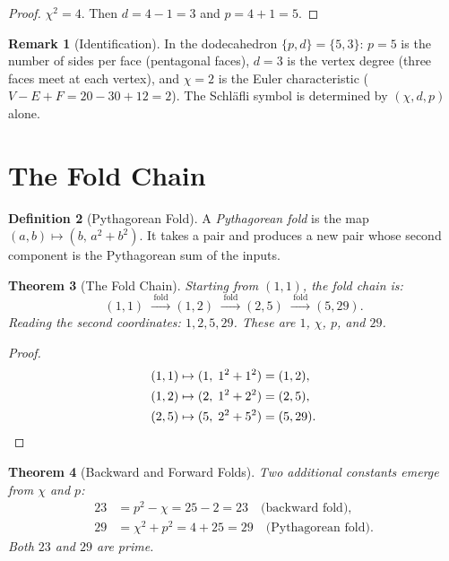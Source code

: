 \documentclass[11pt,a4paper]{article}
\theoremstyle{plain}
\newtheorem{theorem}{Theorem}[section]
\theoremstyle{definition}
\newtheorem{definition}[theorem]{Definition}
\newtheorem{remark}[theorem]{Remark}
\begin{document}
\begin{proof}
$\chi^2 = 4$. Then $d = 4 - 1 = 3$ and $p = 4 + 1 = 5$.
\end{proof}

\begin{remark}[Identification]\label{rem:identification}
In the dodecahedron $\{p, d\} = \{5, 3\}$:
$p = 5$ is the number of sides per face (pentagonal faces),
$d = 3$ is the vertex degree (three faces meet at each vertex),
and $\chi = 2$ is the Euler characteristic ($V - E + F = 20 - 30 + 12 = 2$).
The Schl\"afli symbol is determined by $(\chi, d, p)$ alone.
\end{remark}

\section{The Fold Chain}\label{sec:folds}

\begin{definition}[Pythagorean Fold]\label{def:fold}
A \emph{Pythagorean fold} is the map $(a, b) \mapsto (b,\, a^2 + b^2)$.
It takes a pair and produces a new pair whose second component is the
Pythagorean sum of the inputs.
\end{definition}

\begin{theorem}[The Fold Chain]\label{thm:fold-chain}
Starting from $(1, 1)$, the fold chain is:
\begin{equation}\label{eq:fold-chain}
  (1, 1) \;\xrightarrow{\;\text{fold}\;}
  (1, 2) \;\xrightarrow{\;\text{fold}\;}
  (2, 5) \;\xrightarrow{\;\text{fold}\;}
  (5, 29).
\end{equation}
Reading the second coordinates: $1, 2, 5, 29$.
These are $1$, $\chi$, $p$, and $29$.
\end{theorem}

\begin{proof}
\begin{align*}
  (1, 1) &\mapsto (1,\; 1^2 + 1^2) = (1, 2), \\
  (1, 2) &\mapsto (2,\; 1^2 + 2^2) = (2, 5), \\
  (2, 5) &\mapsto (5,\; 2^2 + 5^2) = (5, 29). \qedhere
\end{align*}
\end{proof}

\begin{theorem}[Backward and Forward Folds]\label{thm:23-29}
Two additional constants emerge from $\chi$ and $p$:
\begin{align}
  23 &= p^2 - \chi = 25 - 2 = 23
  \quad\text{(backward fold),} \label{eq:23} \\
  29 &= \chi^2 + p^2 = 4 + 25 = 29
  \quad\text{(Pythagorean fold).} \label{eq:29}
\end{align}
Both $23$ and $29$ are prime.
\end{theorem}
\end{document}
